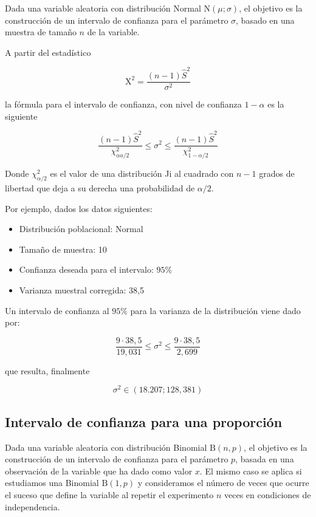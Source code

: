 \documentclass[
]{article}
\providecommand{\tightlist}{%
  \setlength{\itemsep}{0pt}\setlength{\parskip}{0pt}}
\begin{document}
Dada una variable aleatoria con distribución Normal \(\mathrm{N}(\mu ; \sigma)\), el objetivo es la construcción de un intervalo de confianza para el parámetro \(\sigma\), basado en una muestra de tamaño \(n\) de la variable.

A partir del estadístico

\[
\mathrm{X}^{2}=\frac{(n-1) \hat{S}^{2}}{\sigma^{2}}
\]

la fórmula para el intervalo de confianza, con nivel de confianza \(1-\alpha\) es la siguiente

\[
\frac{(n-1) \hat{S}^{2}}{\chi_{\alpha a / 2}^{2}} \leq \sigma^{2} \leq \frac{(n-1) \hat{S}^{2}}{\chi_{1-\alpha / 2}^{2}}
\]

Donde \(\chi_{\alpha / 2}^{2}\) es el valor de una distribución Ji al cuadrado con \(n-1\) grados de libertad que deja a su derecha una probabilidad de \(\alpha / 2\).

Por ejemplo, dados los datos siguientes:

\begin{itemize}
\tightlist
\item
  Distribución poblacional: Normal
\item
  Tamaño de muestra: 10
\item
  Confianza deseada para el intervalo: \(95 \%\)
\item
  Varianza muestral corregida: 38,5
\end{itemize}

Un intervalo de confianza al \(95 \%\) para la varianza de la distribución viene dado por:

\[
\frac{9 \cdot 38,5}{19,031} \leq \sigma^{2} \leq \frac{9 \cdot 38,5}{2,699}
\]

que resulta, finalmente

\[
\sigma^{2} \in(18.207 ; 128,381)
\]

\subsection{Intervalo de confianza para una proporción}\label{intervalo-de-confianza-para-una-proporciuxf3n}

Dada una variable aleatoria con distribución Binomial \(\mathrm{B}(n, p)\), el objetivo es la construcción de un intervalo de confianza para el parámetro \(p\), basada en una observación de la variable que ha dado como valor \(x\). El mismo caso se aplica si estudiamos una Binomial \(\mathrm{B}(1, p)\) y consideramos el número de veces que ocurre el suceso que define la variable al repetir el experimento \(n\) veces en condiciones de independencia.
\end{document}
